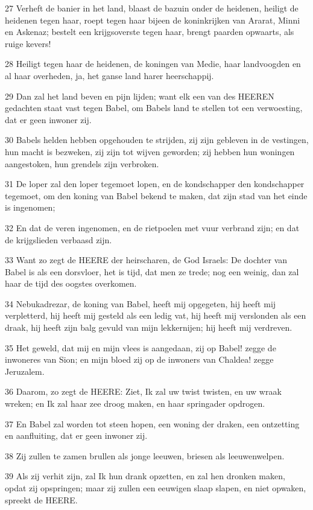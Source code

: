 \par 27 Verheft de banier in het land, blaast de bazuin onder de heidenen, heiligt de heidenen tegen haar, roept tegen haar bijeen de koninkrijken van Ararat, Minni en Askenaz; bestelt een krijgsoverste tegen haar, brengt paarden opwaarts, als ruige kevers!
\par 28 Heiligt tegen haar de heidenen, de koningen van Medie, haar landvoogden en al haar overheden, ja, het ganse land harer heerschappij.
\par 29 Dan zal het land beven en pijn lijden; want elk een van des HEEREN gedachten staat vast tegen Babel, om Babels land te stellen tot een verwoesting, dat er geen inwoner zij.
\par 30 Babels helden hebben opgehouden te strijden, zij zijn gebleven in de vestingen, hun macht is bezweken, zij zijn tot wijven geworden; zij hebben hun woningen aangestoken, hun grendels zijn verbroken.
\par 31 De loper zal den loper tegemoet lopen, en de kondschapper den kondschapper tegemoet, om den koning van Babel bekend te maken, dat zijn stad van het einde is ingenomen;
\par 32 En dat de veren ingenomen, en de rietpoelen met vuur verbrand zijn; en dat de krijgslieden verbaasd zijn.
\par 33 Want zo zegt de HEERE der heirscharen, de God Israels: De dochter van Babel is als een dorsvloer, het is tijd, dat men ze trede; nog een weinig, dan zal haar de tijd des oogstes overkomen.
\par 34 Nebukadrezar, de koning van Babel, heeft mij opgegeten, hij heeft mij verpletterd, hij heeft mij gesteld als een ledig vat, hij heeft mij verslonden als een draak, hij heeft zijn balg gevuld van mijn lekkernijen; hij heeft mij verdreven.
\par 35 Het geweld, dat mij en mijn vlees is aangedaan, zij op Babel! zegge de inwoneres van Sion; en mijn bloed zij op de inwoners van Chaldea! zegge Jeruzalem.
\par 36 Daarom, zo zegt de HEERE: Ziet, Ik zal uw twist twisten, en uw wraak wreken; en Ik zal haar zee droog maken, en haar springader opdrogen.
\par 37 En Babel zal worden tot steen hopen, een woning der draken, een ontzetting en aanfluiting, dat er geen inwoner zij.
\par 38 Zij zullen te zamen brullen als jonge leeuwen, briesen als leeuwenwelpen.
\par 39 Als zij verhit zijn, zal Ik hun drank opzetten, en zal hen dronken maken, opdat zij opspringen; maar zij zullen een eeuwigen slaap slapen, en niet opwaken, spreekt de HEERE.
